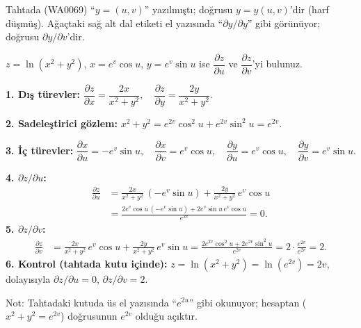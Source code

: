 \begin{bilgi}
Tahtada (WA0069) ``$y=(u,v)$'' yazılmıştı; doğrusu $y=y(u,v)$'dir (harf düşmüş). Ağaçtaki sağ alt dal etiketi el
yazısında ``$\partial y/\partial y$'' gibi görünüyor; doğrusu $\partial y/\partial v$'dir.
\end{bilgi}

\begin{soru}
$z=\ln(x^2+y^2)$, $x=e^{v}\cos u$, $y=e^{v}\sin u$ ise $\dfrac{\partial z}{\partial u}$ ve $\dfrac{\partial z}{\partial v}$'yi bulunuz.
\end{soru}
\begin{cevap}
\textbf{1. Dış türevler:}
$\dfrac{\partial z}{\partial x}=\dfrac{2x}{x^2+y^2},\quad \dfrac{\partial z}{\partial y}=\dfrac{2y}{x^2+y^2}$.

\textbf{2. Sadeleştirici gözlem:} $x^2+y^2=e^{2v}\cos^2u+e^{2v}\sin^2u=e^{2v}$.

\textbf{3. İç türevler:}
$\dfrac{\partial x}{\partial u}=-e^{v}\sin u,\quad \dfrac{\partial x}{\partial v}=e^{v}\cos u,\quad
\dfrac{\partial y}{\partial u}=e^{v}\cos u,\quad \dfrac{\partial y}{\partial v}=e^{v}\sin u$.

\textbf{4. $\partial z/\partial u$:}
\begin{align*}
\frac{\partial z}{\partial u}&=\frac{2x}{x^2+y^2}\,(-e^{v}\sin u)+\frac{2y}{x^2+y^2}\,e^{v}\cos u\\
&=\frac{2e^{v}\cos u\,(-e^{v}\sin u)+2e^{v}\sin u\,e^{v}\cos u}{e^{2v}}=\boxed{0}.
\end{align*}
\textbf{5. $\partial z/\partial v$:}
\begin{align*}
\frac{\partial z}{\partial v}&=\frac{2x}{x^2+y^2}\,e^{v}\cos u+\frac{2y}{x^2+y^2}\,e^{v}\sin u
=\frac{2e^{2v}\cos^2u+2e^{2v}\sin^2u}{e^{2v}}=2\cdot\frac{e^{2v}}{e^{2v}}=\boxed{2}.
\end{align*}
\textbf{6. Kontrol (tahtada kutu içinde):} $z=\ln(x^2+y^2)=\ln(e^{2v})=2v$, dolayısıyla $\partial z/\partial u=0$,
$\partial z/\partial v=2$. \checkmark

Not: Tahtadaki kutuda üs el yazısında ``$e^{2u}$'' gibi okunuyor; hesaptan ($x^2+y^2=e^{2v}$) doğrusunun $e^{2v}$ olduğu
açıktır.
\end{cevap}

